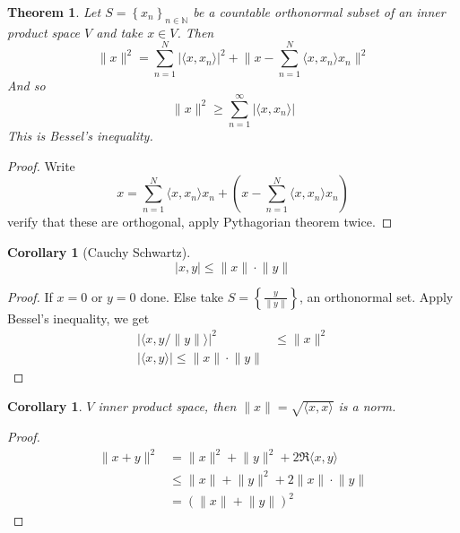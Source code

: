 \documentclass[11pt,a4paper]{article}
\theoremstyle{definition}
\theoremstyle{plain}
\newtheorem{theorem}[definition]{Theorem}
\newtheorem{corollary}[definition]{Corollary}
\theoremstyle{remark}
\newcommand{\N}{\mathbb{N}}
\renewcommand{\set}[1]{\left\{ #1 \right\}}
\newcommand{\angles}[1]{\langle #1 \rangle}
\newcommand{\abs}[1]{\lvert #1 \rvert}
\newcommand{\norm}[1]{\lVert #1 \rVert}
\newcommand{\1}{\mathbbm{1}}
\begin{document}
\begin{theorem}
    Let $S = \set{x_n}_{n \in \N}$ be a countable orthonormal subset of an inner product space $V$ and take $x \in V$. Then 
    $$\norm{x}^2 = \sum_{n=1}^N \abs{\angles{x, x_n}}^2 + \norm{x - \sum_{n=1}^N \angles{x, x_n} x_n}^2$$
    And so 
    $$\norm{x}^2 \ge \sum_{n=1}^\infty \abs{\angles{x, x_n}}$$
    This is Bessel's inequality.
\end{theorem}

\begin{proof}
    Write 
    $$x = \sum_{n=1}^N \angles{x, x_n} x_n + (x - \sum_{n=1}^N \angles{x, x_n} x_n)$$
    verify that these are orthogonal, apply Pythagorian theorem twice. 
\end{proof}

\begin{corollary}[Cauchy Schwartz]
    $$\abs{x,y} \le \norm{x} \cdot \norm{y}$$
\end{corollary}

\begin{proof}
    If $x = 0$ or $y = 0$ done. Else take $S = \set{\frac{y}{\norm{y}}}$, an orthonormal set. Apply Bessel's inequality, we get 
    \begin{align*}
        \abs{\angles{x, y/\norm{y}}}^2 &\le \norm{x}^2 \\
        \abs{\angles{x, y}} \le \norm{x} \cdot \norm{y}
    \end{align*} 
\end{proof}

\begin{corollary}
    $V$ inner product space, then $\norm{x} = \sqrt{\angles{x, x}}$ is a norm.
\end{corollary}

\begin{proof}
    \begin{align*}
        \norm{x + y}^2 &= \norm{x}^2 + \norm{y}^2 + 2 \Re \angles{x, y} \\
        &\le \norm{x} + \norm{y}^2 + 2 \norm{x} \cdot \norm{y} \\
        &= (\norm{x} + \norm{y})^2
    \end{align*}
\end{proof}
\end{document}
